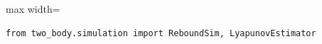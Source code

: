 \begin{listing}[H]
\caption{Ejemplo de importación desde el paquete}
\begin{adjustbox}{max width=\textwidth}
\begin{minipage}{\textwidth}
\begin{verbatim}
from two_body.simulation import ReboundSim, LyapunovEstimator
\end{verbatim}
\end{minipage}
\end{adjustbox}
\end{listing}
\vspace{0.2cm}

